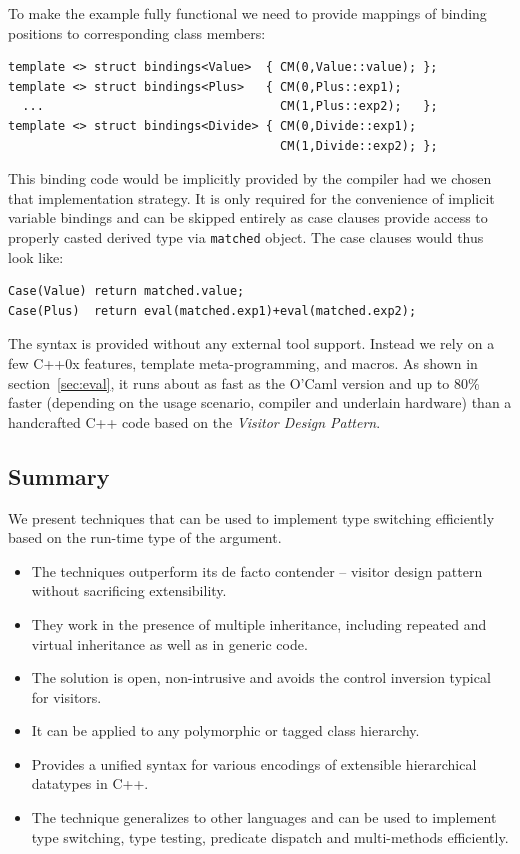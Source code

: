 \documentclass[preprint]{sigplanconf}
\makeatletter
\DeclareRobustCommand{\code}[1]{{\lstinline[breaklines=false,escapechar=@]{#1}}}
\makeatother
\begin{document}
\noindent
To make the example fully functional we need to provide mappings of binding 
positions to corresponding class members:

\begin{lstlisting}[keepspaces,columns=flexible]
template <> struct bindings<Value>  { CM(0,Value::value); };
template <> struct bindings<Plus>   { CM(0,Plus::exp1); 
  ...                                 CM(1,Plus::exp2);   };
template <> struct bindings<Divide> { CM(0,Divide::exp1); 
                                      CM(1,Divide::exp2); };
\end{lstlisting}

\noindent
This binding code would be implicitly provided by the compiler had we chosen 
that implementation strategy. It is only required for the convenience of 
implicit variable bindings and can be skipped entirely as case clauses provide 
access to properly casted derived type via \code{matched} object. The case 
clauses would thus look like:

\begin{lstlisting}[keepspaces,columns=flexible]
Case(Value) return matched.value;
Case(Plus)  return eval(matched.exp1)+eval(matched.exp2);
\end{lstlisting}

\noindent
The syntax is provided without any external tool support. Instead we rely on a 
few C++0x features\cite{C++0x}, template meta-programming, and macros. As shown 
in section~\ref{sec:eval}, it runs about as fast as the O'Caml version and up to 
80\% faster (depending on the usage scenario, compiler and underlain hardware) 
than a handcrafted C++ code based on the \emph{Visitor Design Pattern}.

\subsection{Summary}

We present techniques that can be used to implement type switching efficiently 
based on the run-time type of the argument.

  \begin{itemize}
  \setlength{\itemsep}{0pt}
  \setlength{\parskip}{0pt}
  \item The techniques outperform its de facto contender -- visitor design 
        pattern without sacrificing extensibility.
  \item They work in the presence of multiple inheritance, including repeated and 
        virtual inheritance as well as in generic code.
  \item The solution is open, non-intrusive and avoids the control inversion 
        typical for visitors. 
  \item It can be applied to any polymorphic or tagged class hierarchy.
  \item Provides a unified syntax for various encodings of extensible 
        hierarchical datatypes in C++.
  \item The technique generalizes to other languages and can be used to 
        implement type switching, type testing, predicate dispatch and 
        multi-methods efficiently.
  \end{itemize}
\end{document}

